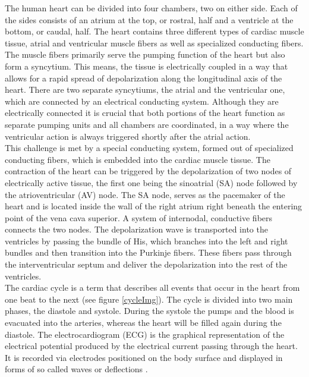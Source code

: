 The human heart can be divided into four chambers, two on either side. Each of the sides consists of an atrium at the top, or rostral, half and a ventricle at the bottom, or caudal, half. The heart contains three different types of cardiac muscle tissue, atrial and ventricular muscle fibers as well as specialized conducting fibers. The muscle fibers primarily serve the pumping function of the heart but also form a syncytium. This means, the tissue is electrically coupled in a way that allows for a rapid spread of depolarization along the longitudinal axis of the heart. There are two separate syncytiums, the atrial and the ventricular one, which are connected by an electrical conducting system. Although they are electrically connected it is crucial that both portions of the heart function as separate pumping units and all chambers are coordinated, in a way where the ventricular action is always triggered shortly after the atrial action.\\
This challenge is met by a special conducting system, formed out of specialized conducting fibers, which is embedded into the cardiac muscle tissue. The contraction of the heart can be triggered by the depolarization of two nodes of electrically active tissue, the first one being the sinoatrial (SA) node followed by the atrioventricular (AV) node. The SA node, serves as the pacemaker of the heart and is located inside the wall of the right atrium right beneath the entering point of the vena cava superior.  
A system of internodal, conductive fibers connects the two nodes. The depolarization wave is transported into the ventricles by passing the bundle of His, which branches into the left and right bundles and then transition into the Purkinje fibers. These fibers pass through the interventricular septum and deliver the depolarization into the rest of the ventricles.\\
The cardiac cycle is a term that describes all events that occur in the heart from one beat to the next (see figure \ref{cycleImg}). The cycle is divided into two main phases, the diastole and systole. During the systole the pumps and the blood is evacuated into the arteries, whereas the heart will be filled again during the diastole. The electrocardiogram (ECG) is the graphical representation of the electrical potential produced by the electrical current passing through the heart. It is recorded via electrodes positioned on the body surface and displayed in forms of so called waves or deflections \cite{ABDULLA2014}.

